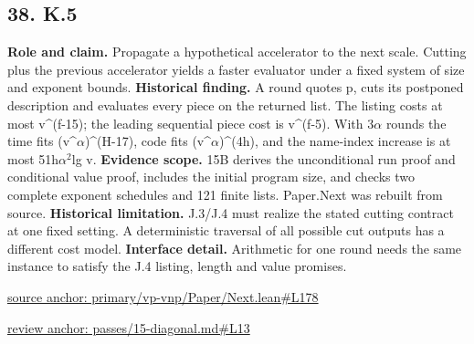 \documentclass[11pt,letterpaper]{article}
\theoremstyle{definition}\newtheorem{definition}[theorem]{Definition}\newtheorem{example}[theorem]{Example}
\theoremstyle{remark}\newtheorem{remark}[theorem]{Remark}
\begin{document}
\subsection*{38. K.5}
\textbf{Role and claim.} Propagate a hypothetical accelerator to the next scale. Cutting plus the previous accelerator yields a faster evaluator under a fixed system of size and exponent bounds.
\textbf{Historical finding.} A round quotes p, cuts its postponed description and evaluates every piece on the returned list. The listing costs at most v\textasciicircum{}(f-15); the leading sequential piece cost is v\textasciicircum{}(f-5). With 3\ensuremath{\alpha} rounds the time fits (v\textasciicircum{}\ensuremath{\alpha})\textasciicircum{}(H-17), code fits (v\textasciicircum{}\ensuremath{\alpha})\textasciicircum{}(4h), and the name-index increase is at most 51h\ensuremath{\alpha}\ensuremath{{}^2}lg v.
\textbf{Evidence scope.} 15B derives the unconditional run proof and conditional value proof, includes the initial program size, and checks two complete exponent schedules and 121 finite lists. Paper.Next was rebuilt from source.
\textbf{Historical limitation.} J.3/J.4 must realize the stated cutting contract at one fixed setting. A deterministic traversal of all possible cut outputs has a different cost model.
\textbf{Interface detail.} Arithmetic for one round needs the same instance to satisfy the J.4 listing, length and value promises.
\par\href{https://github.com/nousentllc/VP-VNP-Review/blob/8a7976933b6b2b4ffda1ad3a0dfb5fc6b6f023e8/primary/vp-vnp/Paper/Next.lean\#L178}{source anchor: primary/vp-vnp/Paper/Next.lean\#L178}
\par\href{https://github.com/nousentllc/VP-VNP-Review/blob/8a7976933b6b2b4ffda1ad3a0dfb5fc6b6f023e8/passes/15-diagonal.md\#L13}{review anchor: passes/15-diagonal.md\#L13}
\goodbreak
{}
\hypertarget{claim.39}{}
\end{document}
